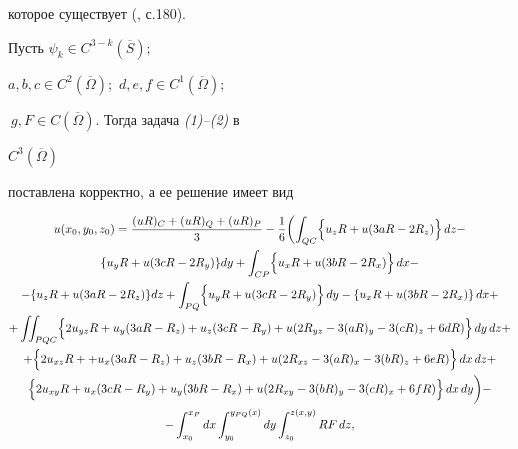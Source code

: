которое существует (\cite{Mu}, с.180).





\begin{thm} Пусть $\psi_{k} \in C^{3-k}(\overline{S} );$


$a,b,c\in C^{2}(\overline{\Omega} );$ $d,e,f\in C^{1}(\overline{\Omega} );$


$\ g,F\in C(\overline{\Omega} ).$ Тогда задача {\em (1)--(2)} в


$C^{3}(\overline{\Omega } )$


поставлена корректно, а ее решение имеет вид


\begin{gather}


u(x_{0},y_{0},z_{0})=\frac{(uR)_{C}+(uR)_{Q}+(uR)_{P}}{3} -\frac{1}{6} \biggl( \int_{QC} \Bigl \{


u_{z}R+u(3aR-2R_{z})\Bigr \} \, dz-\notag\\


%


\{ u_{y}R+u(3cR-2R_{y})\}dy+\int_{CP} \Bigl \{ u_{x}R+u(3bR-2R_{x})\Bigr \} \, dx-\notag\\


%


-\{u_{z}R+u(3aR-2R_{z})\}dz+\int_{PQ} \Bigl \{


u_{y}R+u(3cR-2R_{y})\Bigr \} \, dy-\{ u_{x}R+u(3bR-2R_{x})\} \, dx+\notag\\


%


+\iint_{PQC} \Bigl \{2u_{yz}R+


u_{y}(3aR-R_{z})+u_{z}(3cR-R_{y})+u(2R_{yz}-3(aR)_{y}-3(cR)_{z}+6dR)\Bigr \} \, dy\, dz+\notag\\


%


+\Bigl \{


2u_{xz}R+


+u_{x}(3aR-R_{z})+u_{z}(3bR-R_{x})+u(2R_{xz}-3(aR)_{x}-3(bR)_{z}+6eR)\Bigr \} \, dx\, dz+\notag\\


%


\Bigl \{2u_{xy}R+


u_{x}(3cR-R_{y})+u_{y}(3bR-R_{x})+u(2R_{xy}-3(bR)_{y}-3(cR)_{x}+6fR)\Bigr \}\,


dx\,dy\biggr) -\notag\\


%


-\int_{x_{0}}^{x_{P}} dx\int_{y_{0}}^{y_{PQ}(x)}dy\int_{z_{0}}^{z(x,y)} RF\, dz,



\end{gather}
\end{thm}
